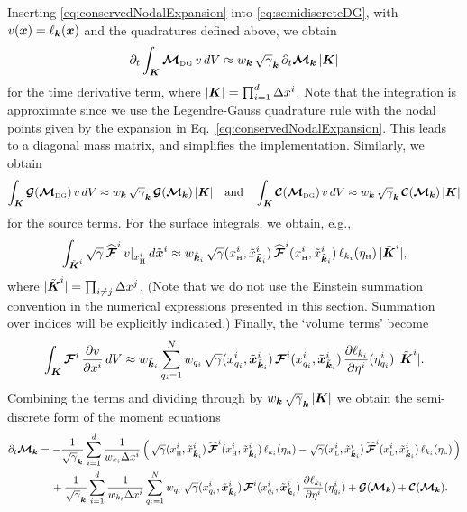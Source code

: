 \documentclass[10pt,preprint]{aastex}
\begin{document}
Inserting \eqref{eq:conservedNodalExpansion} into \eqref{eq:semidiscreteDG}, with $v(\boldsymbol{x})=\ell_{\boldsymbol{k}}(\boldsymbol{x})$ and the quadratures defined above, we obtain
\begin{equation}
  \partial_{t}{}\int_{\boldsymbol{K}}\boldsymbol{\mathcal{M}}_{\mbox{\tiny DG}}\,v\,dV
  \approx w_{\boldsymbol{k}}\,\sqrt{\gamma}_{\boldsymbol{k}}\,\partial_{t}{}\boldsymbol{\mathcal{M}}_{\boldsymbol{k}}\,|\boldsymbol{K}|
\end{equation}
for the time derivative term, where $|\boldsymbol{K}|=\prod_{i=1}^{d}\Delta x^{i}$.  
Note that the integration is approximate since we use the Legendre-Gauss quadrature rule with the nodal points given by the expansion in Eq.~\eqref{eq:conservedNodalExpansion}.  
This leads to a diagonal mass matrix, and simplifies the implementation.  
Similarly, we obtain
\begin{equation}
  \int_{\boldsymbol{K}}\boldsymbol{\mathcal{G}}(\boldsymbol{\mathcal{M}}_{\mbox{\tiny DG}})\,v\,dV
  \approx w_{\boldsymbol{k}}\,\sqrt{\gamma}_{\boldsymbol{k}}\,\boldsymbol{\mathcal{G}}(\boldsymbol{\mathcal{M}}_{\boldsymbol{k}})\,|\boldsymbol{K}| \quad\text{and}\quad
  \int_{\boldsymbol{K}}\boldsymbol{\mathcal{C}}(\boldsymbol{\mathcal{M}}_{\mbox{\tiny DG}})\,v\,dV
  \approx w_{\boldsymbol{k}}\,\sqrt{\gamma}_{\boldsymbol{k}}\,\boldsymbol{\mathcal{C}}(\boldsymbol{\mathcal{M}}_{\boldsymbol{k}})\,|\boldsymbol{K}|
\end{equation}
for the source terms.  
For the surface integrals, we obtain, e.g., 
\begin{equation}
  \int_{\tilde{\boldsymbol{K}}^{i}}\sqrt{\gamma}\,\widehat{\boldsymbol{\mathcal{F}}}^{i}\,v|_{x_{\mbox{\tiny H}}^{i}}\,d\tilde{\boldsymbol{x}}^{i}
  \approx w_{\tilde{\boldsymbol{k}}_{i}}\,\sqrt{\gamma}(x_{\mbox{\tiny H}}^{i},\tilde{x}_{\tilde{\boldsymbol{k}}_{i}}^{i})\,
  \widehat{\boldsymbol{\mathcal{F}}}^{i}(x_{\mbox{\tiny H}}^{i},\tilde{x}_{\tilde{\boldsymbol{k}}_{i}}^{i})\,\ell_{k_{i}}(\eta_{\mbox{\tiny H}})\,|\tilde{\boldsymbol{K}}^{i}|,
\end{equation}
where $|\tilde{\boldsymbol{K}}^{i}|=\prod_{i\ne j}\Delta x^{j}$.  
(Note that we do not use the Einstein summation convention in the numerical expressions presented in this section.  
Summation over indices will be explicitly indicated.)  
Finally, the `volume terms' become
\begin{equation}
  \int_{\boldsymbol{K}}\boldsymbol{\mathcal{F}}^{i}\,\frac{\partial v}{\partial x^{i}}\,dV
  \approx w_{\tilde{\boldsymbol{k}}_{i}}\sum_{q_{i}=1}^{N}w_{q_{i}}\,\sqrt{\gamma}(x_{q_{i}}^{i},\tilde{\boldsymbol{x}}_{\tilde{\boldsymbol{k}}_{i}}^{i})\,
  \boldsymbol{\mathcal{F}}^{i}(x_{q_{i}}^{i},\tilde{\boldsymbol{x}}_{\tilde{\boldsymbol{k}}_{i}}^{i})\,\frac{\partial \ell_{k_{i}}}{\partial \eta^{i}}(\eta_{q_{i}}^{i})\,|\tilde{\boldsymbol{K}}^{i}|.  
\end{equation}
Combining the terms and dividing through by $w_{\boldsymbol{k}}\,\sqrt{\gamma}_{\boldsymbol{k}}\,|\boldsymbol{K}|$ we obtain the semi-discrete form of the moment equations
\begin{align}
  \partial_{t}{\boldsymbol{\mathcal{M}}_{\boldsymbol{k}}}
  &=
  -\frac{1}{\sqrt{\gamma}_{\boldsymbol{k}}}\sum_{i=1}^{d} 
  \frac{1}{w_{k_{i}}\Delta x^{i}}\,
  \Big(\,
    \sqrt{\gamma}(x_{\mbox{\tiny H}}^{i},\tilde{x}_{\tilde{\boldsymbol{k}}_{i}}^{i})\,\widehat{\boldsymbol{\mathcal{F}}}^{i}(x_{\mbox{\tiny H}}^{i},\tilde{x}_{\tilde{\boldsymbol{k}}_{i}}^{i})\,\ell_{k_{i}}(\eta_{\mbox{\tiny H}})
    -\sqrt{\gamma}(x_{\mbox{\tiny L}}^{i},\tilde{x}_{\tilde{\boldsymbol{k}}_{i}}^{i})\,\widehat{\boldsymbol{\mathcal{F}}}^{i}(x_{\mbox{\tiny L}}^{i},\tilde{x}_{\tilde{\boldsymbol{k}}_{i}}^{i})\,\ell_{k_{i}}(\eta_{\mbox{\tiny L}})
  \,\Big)
  \nonumber \\
  &\hspace{12pt}
  +\frac{1}{\sqrt{\gamma}_{\boldsymbol{k}}}\sum_{i=1}^{d}\frac{1}{w_{k_{i}}\Delta x^{i}}
  \sum_{q_{i}=1}^{N}w_{q_{i}}\,\sqrt{\gamma}(x_{q_{i}}^{i},\tilde{\boldsymbol{x}}_{\tilde{\boldsymbol{k}}_{i}}^{i})\,
  \boldsymbol{\mathcal{F}}^{i}(x_{q_{i}}^{i},\tilde{\boldsymbol{x}}_{\tilde{\boldsymbol{k}}_{i}}^{i})\,\frac{\partial \ell_{k_{i}}}{\partial \eta^{i}}(\eta_{q_{i}}^{i})
  +\boldsymbol{\mathcal{G}}(\boldsymbol{\mathcal{M}}_{\boldsymbol{k}})+\boldsymbol{\mathcal{C}}(\boldsymbol{\mathcal{M}}_{\boldsymbol{k}}).
  \label{eq:semidiscreteDiscretized}
\end{align}
\end{document}
